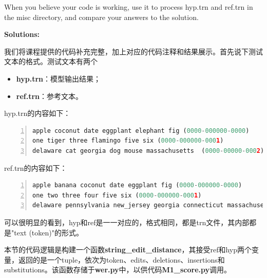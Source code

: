 When you believe your code is working, use it to process hyp.trn and ref.trn in the misc directory, and compare your answers to the solution.

{\bf Solutions:}

我们将课程提供的代码补充完整，加上对应的代码注释和结果展示。首先说下测试文本的格式。测试文本有两个
\begin{itemize}
	\item {\bf hyp.trn}：模型输出结果；
	\item {\bf ref.trn}：参考文本。
\end{itemize}

hyp.trn的内容如下：
\begin{lstlisting}[language = python, numbers=left, 
				 numberstyle=\tiny,keywordstyle=\color{blue!70},
				 commentstyle=\color{red!50!green!50!blue!50},frame=shadowbox,
				 rulesepcolor=\color{red!20!green!20!blue!20},basicstyle=\ttfamily]
apple coconut date eggplant elephant fig (0000-000000-0000)
one tiger three flamingo five six (0000-000000-0001)
delaware cat georgia dog mouse massachusetts  (0000-00000-0002)
\end{lstlisting}

ref.trn的内容如下：
\begin{lstlisting}[language = python, numbers=left, 
				 numberstyle=\tiny,keywordstyle=\color{blue!70},
				 commentstyle=\color{red!50!green!50!blue!50},frame=shadowbox,
				 rulesepcolor=\color{red!20!green!20!blue!20},basicstyle=\ttfamily]
apple banana coconut date eggplant fig (0000-000000-0000)
one two three four five six (0000-000000-0001)
delaware pennsylvania new_jersey georgia connecticut massachusetts  (0000-00000-0002)
\end{lstlisting}

可以很明显的看到，hyp和ref是一一对应的，格式相同，都是trn文件，其内部都是"text (token)"的形式。

本节的代码逻辑是构建一个函数{\bf string\_edit\_distance}，其接受ref和hyp两个变量，返回的是一个tuple，依次为token、edits、deletions、insertions和substitutions。该函数存储于{\bf wer.py}中，以供代码{\bf M1\_score.py}调用。

